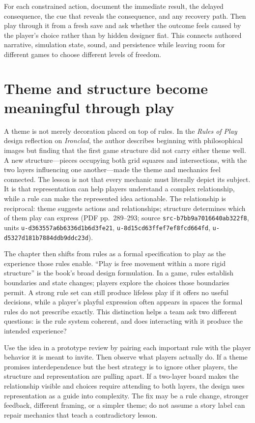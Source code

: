 For each constrained action, document the immediate result, the delayed consequence, the cue that reveals the consequence, and any recovery path. Then play through it from a fresh save and ask whether the outcome feels caused by the player's choice rather than by hidden designer fiat. This connects authored narrative, simulation state, sound, and persistence while leaving room for different games to choose different levels of freedom.

\section{Theme and structure become meaningful through play}\label{06-engine-ii-ch047-theme-and-structure-become-meaningful-through-play}

A theme is not merely decoration placed on top of rules. In the \emph{Rules of Play} design reflection on \emph{Ironclad}, the author describes beginning with philosophical images but finding that the first game structure did not carry either theme well. A new structure---pieces occupying both grid squares and intersections, with the two layers influencing one another---made the theme and mechanics feel connected. The lesson is not that every mechanic must literally depict its subject. It is that representation can help players understand a complex relationship, while a rule can make the represented idea actionable. The relationship is reciprocal: theme suggests actions and relationships; structure determines which of them play can express (PDF pp.~289--293; source \texttt{src-b7bb9a7016640ab322f8}, units \texttt{u-d363557a6b6336d1b6d3fe21}, \texttt{u-8d15cd63ffef7ef8fcd664fd}, \texttt{u-d5327d181b7884ddb9ddc23d}).

The chapter then shifts from rules as a formal specification to play as the experience those rules enable. ``Play is free movement within a more rigid structure'' is the book's broad design formulation. In a game, rules establish boundaries and state changes; players explore the choices those boundaries permit. A strong rule set can still produce lifeless play if it offers no useful decisions, while a player's playful expression often appears in spaces the formal rules do not prescribe exactly. This distinction helps a team ask two different questions: is the rule system coherent, and does interacting with it produce the intended experience?

Use the idea in a prototype review by pairing each important rule with the player behavior it is meant to invite. Then observe what players actually do. If a theme promises interdependence but the best strategy is to ignore other players, the structure and representation are pulling apart. If a two-layer board makes the relationship visible and choices require attending to both layers, the design uses representation as a guide into complexity. The fix may be a rule change, stronger feedback, different framing, or a simpler theme; do not assume a story label can repair mechanics that teach a contradictory lesson.

